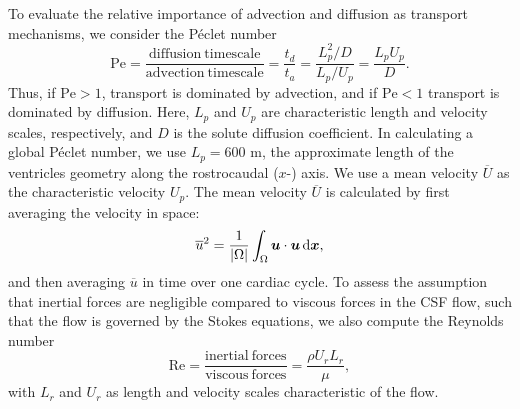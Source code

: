 \documentclass{WileyMSP-template}
\begin{document}
To evaluate the relative importance of advection and
diffusion as transport mechanisms, we consider the Péclet number
\begin{equation*}
    \mathrm{Pe} = \frac{\mathrm{diffusion \ timescale}}{\mathrm{advection \ timescale}}
    = \frac{t_d}{t_a} = \frac{L_p^2/D}{L_p/U_p} = \frac{L_p U_p}{D}.
\end{equation*}
Thus, if $\mathrm{Pe} > 1$, transport is dominated by advection,
and if $\mathrm{Pe} < 1$ transport is dominated by diffusion.
Here, $L_p$ and $U_p$ are characteristic length and velocity scales,
respectively, and $D$ is the solute diffusion coefficient.
In calculating a global Péclet number, we use $L_p=600$ \textmu m, the approximate length of the
ventricles geometry along the rostrocaudal ($x$-) axis.
We use a mean velocity $\overline{U}$ as the characteristic velocity $U_p$.
The mean velocity $\overline{U}$ is calculated by first averaging the velocity in space:
\begin{equation*}
    \overline{u}^2 = \frac{1}{|\Omega|}\int_{\Omega}\bm{u}\cdot\bm{u}\, \mathrm d\bm{x},
\end{equation*}
and then averaging $\overline{u}$ in time over one cardiac cycle.
To assess the assumption that inertial forces are negligible compared to
viscous forces in the CSF flow, such that the flow is governed by the Stokes equations,
we also compute the Reynolds number
\begin{equation*}
    \mathrm{Re} = \frac{\mathrm{inertial \ forces}}{\mathrm{viscous \ forces}} = \frac{\rho U_r L_r}{\mu},
\end{equation*}
with $L_r$ and $U_r$ as length and velocity scales characteristic of the flow. 

\end{document}
